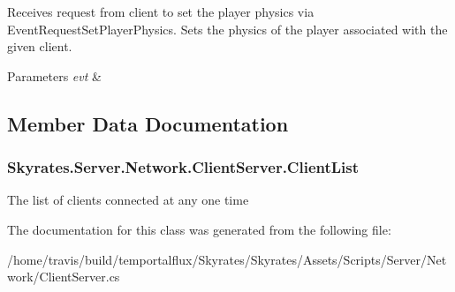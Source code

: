 Receives request from client to set the player physics via Event\-Request\-Set\-Player\-Physics. Sets the physics of the player associated with the given client. 


\begin{DoxyParams}{Parameters}
{\em evt} & \\
\hline
\end{DoxyParams}


\subsection{Member Data Documentation}
\hypertarget{class_skyrates_1_1_server_1_1_network_1_1_client_server_a285b4a86c3dda33cf70d8dad87a11ce3}{
\subsubsection[{Client\-List}]{ Skyrates.\-Server.\-Network.\-Client\-Server.\-Client\-List}}\label{class_skyrates_1_1_server_1_1_network_1_1_client_server_a285b4a86c3dda33cf70d8dad87a11ce3}


The list of clients connected at any one time 



The documentation for this class was generated from the following file\-:\begin{DoxyCompactItemize}
\item 
/home/travis/build/temportalflux/\-Skyrates/\-Skyrates/\-Assets/\-Scripts/\-Server/\-Network/Client\-Server.\-cs\end{DoxyCompactItemize}
